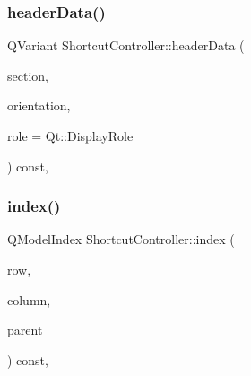 \subsubsection{\texorpdfstring{header\+Data()}{headerData()}}
{\footnotesize\ttfamily Q\+Variant Shortcut\+Controller\+::header\+Data (\begin{DoxyParamCaption}\item[{\mbox{\hyperlink{ioapi_8h_a787fa3cf048117ba7123753c1e74fcd6}{int}}}]{section,  }\item[{Qt\+::\+Orientation}]{orientation,  }\item[{\mbox{\hyperlink{ioapi_8h_a787fa3cf048117ba7123753c1e74fcd6}{int}}}]{role = {\ttfamily Qt\+:\+:DisplayRole} }\end{DoxyParamCaption}) const\hspace{0.3cm}{\ttfamily [override]}, {\ttfamily [virtual]}}

\mbox{\label{class_q_g_b_a_1_1_shortcut_controller_ae75cb760bb05d9e1e20b8f1080884cbd}} 
\subsubsection{\texorpdfstring{index()}{index()}}
{\footnotesize\ttfamily Q\+Model\+Index Shortcut\+Controller\+::index (\begin{DoxyParamCaption}\item[{\mbox{\hyperlink{ioapi_8h_a787fa3cf048117ba7123753c1e74fcd6}{int}}}]{row,  }\item[{\mbox{\hyperlink{ioapi_8h_a787fa3cf048117ba7123753c1e74fcd6}{int}}}]{column,  }\item[{const Q\+Model\+Index \&}]{parent }\end{DoxyParamCaption}) const\hspace{0.3cm}{\ttfamily [override]}, {\ttfamily [virtual]}}

